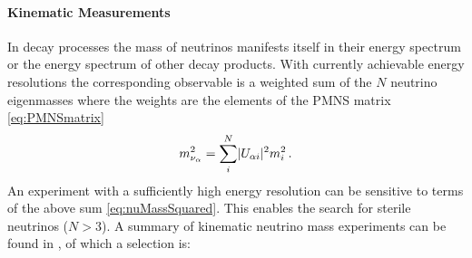     \paragraph{Kinematic Measurements}
    In decay processes the mass of neutrinos manifests itself in their energy spectrum or the energy spectrum of other decay products. With currently achievable energy resolutions the corresponding observable is a weighted sum of the $N$ neutrino eigenmasses where the weights are the elements of the PMNS matrix \eqref{eq:PMNSmatrix} 
    \begin{equation}
    \label{eq:nuMassSquared}
        m^2_{\nu_{\alpha}} = \sum_{i}^{N}\lvert U_{\alpha i}\rvert^2 m_i^2 \text{\,.}
    \end{equation}
    An experiment with a sufficiently high energy resolution can be sensitive to terms of the above sum \eqref{eq:nuMassSquared}. This enables the search for sterile neutrinos ($N>3$). A summary of kinematic neutrino mass experiments can be found in \cite{Otten:2008zz, SeitzM2019, zuber2011neutrino}, of which a selection is:

